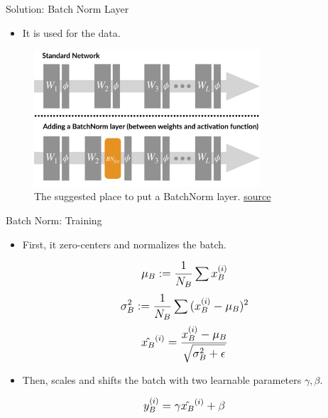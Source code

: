 \begin{frame}{Solution: Batch Norm Layer}
	\begin{itemize}
		\item It is used for  the data.
	\end{itemize}
	\begin{figure}[H]
		\centering
		\includegraphics[width=0.75\textwidth]{Figs/section_4/batchnorm_2.jpg}
		\caption{The suggested place to put a BatchNorm layer. \href{https://gradientscience.org/batchnorm/}{source}}
	\end{figure}
\end{frame}
\begin{frame}{Batch Norm: Training}
	\begin{itemize}
		\item First, it zero-centers and normalizes the batch.
	\end{itemize}
	\vspace{0.05\textheight}
	\begin{equation*}
		\mathlarger{
			\mu_B := \frac{1}{N_B} \sum{x_B^{(i)}}
		}
	\end{equation*}
	\begin{equation*}
		\mathlarger{
			\sigma_B^2 := \frac{1}{N_B} \sum{(x_B^{(i)} - \mu_B)^2}
		}
	\end{equation*}
	\begin{equation*}
		\mathlarger{
			\hat{x_B}^{(i)} = \frac{x_B^{(i)} - \mu_B}{\sqrt{\sigma^2_B + \epsilon}}
		}
	\end{equation*}
	\begin{itemize}
		\item Then, scales and shifts the batch with two learnable parameters $\gamma, \beta$.
	\end{itemize}
	\vspace{0.05\textheight}
	\begin{equation*}
		\mathlarger{
			y_B^{(i)} = \gamma \hat{x_B}^{(i)} + \beta	
		}
	\end{equation*}
\end{frame}
